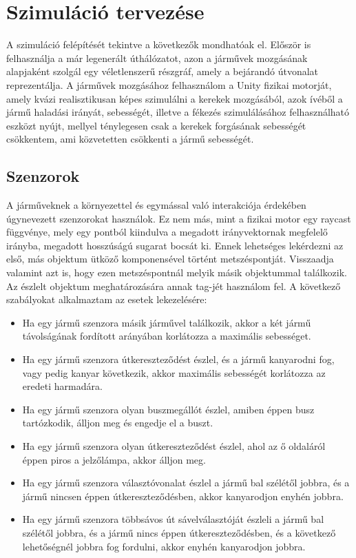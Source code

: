 \section{Szimuláció tervezése}
A szimuláció felépítését tekintve a következők mondhatóak el. Először is felhasználja a már legenerált úthálózatot, azon a járművek mozgásának alapjaként szolgál egy véletlenszerű részgráf, amely a bejárandó útvonalat reprezentálja.
A járművek mozgásához felhasználom a Unity fizikai motorját, amely kvázi realisztikusan képes szimulálni a kerekek mozgásából, azok ívéből a jármű haladási irányát, sebességét, illetve a fékezés szimulálásához felhasználható eszközt nyújt, mellyel ténylegesen csak a kerekek forgásának sebességét csökkentem, ami közvetetten csökkenti a jármű sebességét.
\subsection{Szenzorok}
A járműveknek a környezettel és egymással való interakciója érdekében úgynevezett szenzorokat használok. Ez nem más, mint a fizikai motor egy raycast függvénye, mely egy pontból kiindulva a megadott irányvektornak megfelelő irányba, megadott hosszúságú sugarat bocsát ki. Ennek lehetséges lekérdezni az első, más objektum ütköző komponensével történt metszéspontját. Visszaadja valamint azt is, hogy ezen metszéspontnál melyik másik objektummal találkozik.
Az észlelt objektum meghatározására annak tag-jét használom fel.
A következő szabályokat alkalmaztam az esetek lekezelésére:
\begin{itemize}
\item{Ha egy jármű szenzora másik járművel találkozik, akkor a két jármű távolságának fordított arányában korlátozza a maximális sebességet.}
\item{Ha egy jármű szenzora útkereszteződést észlel, és a jármű kanyarodni fog, vagy pedig kanyar következik, akkor maximális sebességét korlátozza az eredeti harmadára.}
\item{Ha egy jármű szenzora olyan buszmegállót észlel, amiben éppen busz tartózkodik, álljon meg és engedje el a buszt.}
\item{Ha egy jármű szenzora olyan útkereszteződést észlel, ahol az ő oldaláról éppen piros a jelzőlámpa, akkor álljon meg.}
\item{Ha egy jármű szenzora választóvonalat észlel a jármű bal szélétől jobbra, és a jármű nincsen éppen útkereszteződésben, akkor kanyarodjon enyhén jobbra.}
\item{Ha egy jármű szenzora többsávos út sávelválasztóját észleli a jármű bal szélétől jobbra, és a jármű nincs éppen útkereszteződésben, és a következő lehetőségnél jobbra fog fordulni, akkor enyhén kanyarodjon jobbra.}
\end{itemize}
